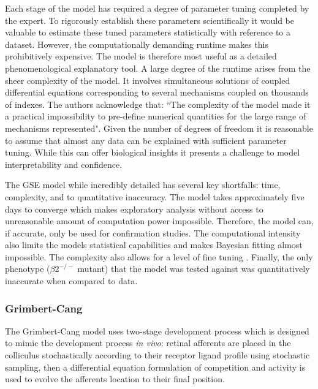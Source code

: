 Each stage of the model has required a degree of parameter tuning completed by the expert. To rigorously establish these parameters scientifically it would be valuable to estimate these tuned parameters statistically with reference to a dataset. However, the computationally demanding runtime makes this prohibitively expensive. The model is therefore most useful as a detailed phenomenological explanatory tool.  A large degree of the runtime arises from the sheer complexity of the model. It involves simultaneous solutions of coupled differential equations corresponding to several mechanisms coupled on thousands of indexes. The authors acknowledge that: ``The complexity of the model made it a practical impossibility to pre-define numerical quantities for the large range of mechanisms represented". Given the number of degrees of freedom it is reasonable to assume that almost any data can be explained with sufficient parameter tuning. While this can offer biological insights it presents a challenge to model interpretability and confidence.

The GSE model while incredibly detailed has several key shortfalls: time, complexity, and to quantitative inaccuracy. The model takes approximately five days to converge which makes exploratory analysis without access to unreasonable amount of computation power impossible. Therefore, the model can, if accurate, only be used for confirmation studies. The computational intensity also limits the models statistical capabilities and makes Bayesian fitting almost impossible. The complexity also allows for a level of fine tuning . Finally, the only phenotype ($\beta2^{-/-}$ mutant) that the model was tested against was quantitatively inaccurate when compared to data.
\subsubsection{Grimbert-Cang}
The Grimbert-Cang model uses two-stage development process which is designed to mimic the development process \textit{in vivo}: retinal afferents are placed in the colliculus stochastically according to their receptor ligand profile using stochastic sampling, then a differential equation formulation of competition and activity is used to evolve the afferents location to their final position. 
